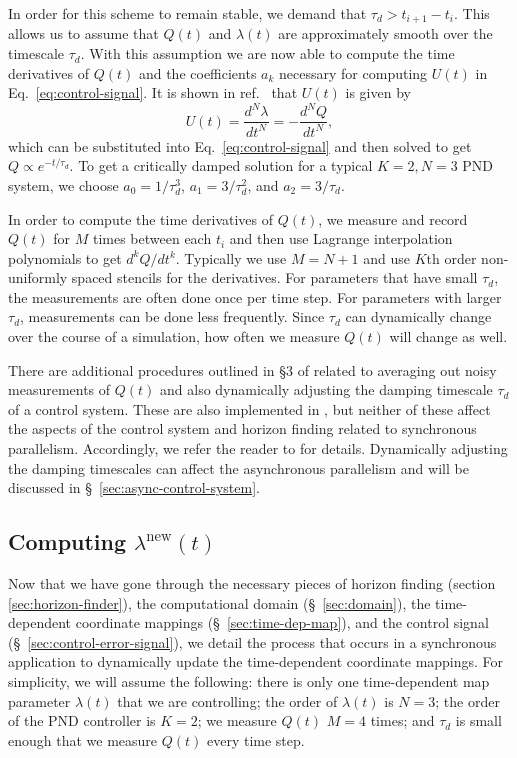 \begin{bibunit}[unsrtnat]
In order for this scheme to remain stable, we
demand that $\tau_{d} > t_{i+1} - t_{i}$. This allows us to assume
that $Q(t)$ and $\lambda(t)$ are approximately
smooth over the timescale $\tau_{d}$.
With this assumption we are now able to compute the time derivatives of $Q(t)$
and the coefficients $a_{k}$ necessary for computing $U(t)$ in
Eq.~\eqref{eq:control-signal}.
It is shown in ref.~\cite{Hemberger:2012jz} that $U(t)$ is given by
\begin{equation}
  \label{eq:UofTdef}
  U(t) = \frac{d^{N}\lambda}{dt^{N}} = -\frac{d^{N}Q}{dt^{N}},
\end{equation}
which can be substituted into Eq.~\eqref{eq:control-signal} and then solved to get
$Q\propto e^{-t/\tau_d}$. To get a critically damped solution for a typical $K
= 2, N = 3$ PND system, we choose $a_{0} = 1/\tau_{d}^{3}$, $a_{1} =
3/\tau_{d}^{2}$, and $a_{2} = 3/\tau_{d}$.

In order to compute the time derivatives of $Q(t)$, we measure and record $Q(t)$
for $M$ times between each $t_i$ and then use Lagrange interpolation polynomials
to get $d^{k}Q/dt^{k}$. Typically we use $M = N + 1$ and use $K\textrm{th}$
order non-uniformly spaced stencils for the derivatives. For parameters that
have small $\tau_d$, the measurements are often done once per time step. For
parameters with larger $\tau_d$, measurements can be done less frequently.
Since $\tau_d$ can dynamically change over the course of a simulation,
how often we measure $Q(t)$ will change as well.

There are additional procedures outlined in \S 3 of \cite{Hemberger:2012jz}
related to averaging out noisy measurements of $Q(t)$ and also dynamically
adjusting the damping timescale $\tau_{d}$ of a control system. These are also
implemented in \spectre, but neither of these affect the aspects of the control
system and horizon finding related to synchronous parallelism. Accordingly, we
refer the reader to \cite{Hemberger:2012jz} for details. Dynamically adjusting
the damping timescales can affect the asynchronous parallelism and will be
discussed in \S~\ref{sec:async-control-system}.

\subsection{Computing \texorpdfstring{$\lambda^\mathrm{new}(t)$}{lambda-new(t)}\label{sec:sync-update-lambda}}

Now that we have gone through the necessary pieces of horizon finding (section
\ref{sec:horizon-finder}), the computational domain (\S~\ref{sec:domain}),
the time-dependent coordinate mappings (\S~\ref{sec:time-dep-map}), and the
control signal (\S~\ref{sec:control-error-signal}), we detail the process
that occurs in a synchronous application to dynamically update the
time-dependent coordinate mappings. For simplicity, we will assume the
following: there is only one time-dependent map parameter $\lambda(t)$ that we
are controlling; the order of $\lambda(t)$ is $N = 3$; the order of the PND
controller is $K = 2$; we measure $Q(t)$ $M = 4$ times; and $\tau_d$ is small
enough that we measure $Q(t)$ every time step.


\end{bibunit}
